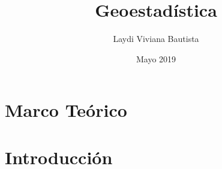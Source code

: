 \documentclass{book}
\title{Geoestadística}
\author{Laydi Viviana Bautista}
\date{Mayo 2019}
\begin{document}
%
%





\chapter{Marco Teórico}



\chapter{Introducción}









%
%


%
%


\printbibliography
\end{document}
